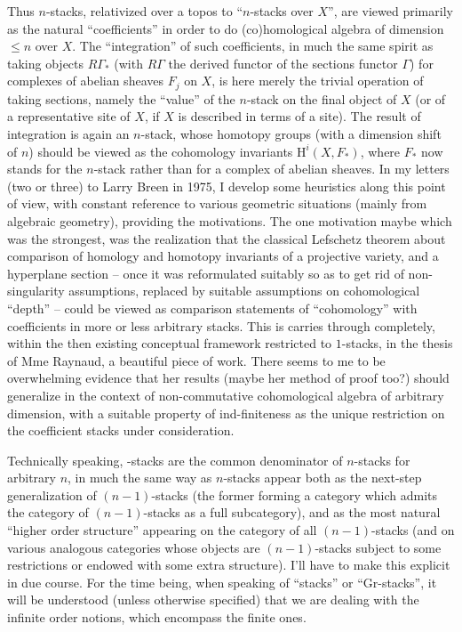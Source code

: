 Thus $n$-stacks, relativized over a topos to ``$n$-stacks over $X$'',
are viewed primarily as the natural ``coefficients'' in order to do
(co)homological algebra of dimension $\le n$ over $X$. The
``integration'' of such coefficients, in much the same spirit as
taking objects $R\Gamma_*$ (with $R\Gamma$ the derived functor of the
sections functor $\Gamma$) for complexes of abelian sheaves $F_j$ on
$X$, is here merely the trivial operation of taking sections, namely
the ``value'' of the $n$-stack on the final object of $X$ (or of a
representative site of $X$, if $X$ is described in terms of a
site). The result of integration is again an $n$-stack, whose homotopy
groups (with a dimension shift of $n$) should be viewed as the
cohomology invariants $\mathrm H^i(X,F_*)$, where $F_*$ now stands for the
$n$-stack rather than for a complex of abelian sheaves. In my letters
(two or three) to Larry Breen in 1975, I develop some heuristics along
this point of view, with constant reference to various geometric
situations (mainly from algebraic geometry), providing the
motivations. The one motivation maybe which was the strongest, was the
realization that the classical Lefschetz theorem about comparison of
homology and homotopy invariants of a projective variety, and a
hyperplane section -- once it was reformulated suitably so as to get
rid of non-singularity assumptions, replaced by suitable assumptions
on cohomological ``depth'' -- could be viewed as comparison statements
of ``cohomology'' with coefficients in more or less arbitrary
stacks. This is carries through completely, within the then existing
conceptual framework restricted to $1$-stacks, in the thesis of Mme
Raynaud, a beautiful piece of work. There seems to me to be
overwhelming evidence that her results (maybe her method of proof
too?) should generalize in the context of non-commutative
cohomological algebra of arbitrary dimension, with a suitable property
of ind-finiteness as the unique restriction on the
coefficient stacks under consideration.

Technically speaking, \oo-stacks are the common denominator of
$n$-stacks for arbitrary $n$, in much the same way as $n$-stacks
appear both as the next-step generalization of $(n-1)$-stacks (the
former forming a category which admits the category of $(n-1)$-stacks
as a full subcategory), and as the most natural ``higher order
structure'' appearing on the category of all $(n-1)$-stacks (and on
various analogous categories whose objects are $(n-1)$-stacks subject
to some restrictions or endowed with some extra structure). I'll have
to make this explicit in due course. For the time being, when speaking
of ``stacks'' or ``Gr-stacks'', it will be understood (unless
otherwise specified) that we are dealing with the infinite order
notions, which encompass the finite ones.

